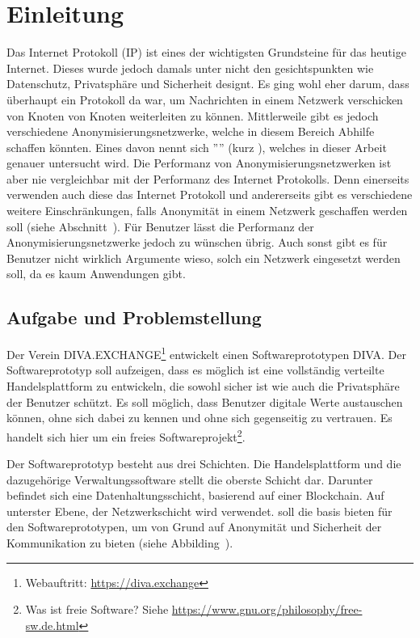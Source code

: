 \chapter{Einleitung}
\label{ch:Einleitung}

Das Internet Protokoll (IP) ist eines der wichtigsten Grundsteine für das heutige Internet.
Dieses wurde jedoch damals unter nicht den gesichtspunkten wie Datenschutz, Privatsphäre und Sicherheit designt.
Es ging wohl eher darum, dass überhaupt ein Protokoll da war, um Nachrichten in einem Netzwerk verschicken von Knoten von Knoten weiterleiten zu können.
Mittlerweile gibt es jedoch verschiedene Anonymisierungsnetzwerke, welche in diesem Bereich Abhilfe schaffen könnten.
Eines davon nennt sich '''' (kurz ), welches in dieser Arbeit genauer untersucht wird.
Die Performanz von Anonymisierungsnetzwerken ist aber nie vergleichbar mit der Performanz des Internet Protokolls.
Denn einerseits verwenden auch diese das Internet Protokoll und andererseits gibt es verschiedene weitere Einschränkungen, falls Anonymität in einem Netzwerk geschaffen werden soll (siehe Abschnitt~). Für Benutzer lässt die Performanz der Anonymisierungsnetzwerke jedoch zu wünschen übrig.
Auch sonst gibt es für Benutzer nicht wirklich Argumente wieso, solch ein Netzwerk eingesetzt werden soll, da es kaum Anwendungen gibt.

\section{Aufgabe und Problemstellung}\label{sec:aufgabe}

Der Verein DIVA.EXCHANGE\footnote{Webauftritt: \url{https://diva.exchange}} entwickelt einen Softwareprototypen DIVA.
Der Softwareprototyp soll aufzeigen, dass es möglich ist eine vollständig verteilte Handelsplattform zu entwickeln,
die sowohl sicher ist wie auch die Privatsphäre der Benutzer schützt.
Es soll möglich, dass Benutzer digitale Werte austauschen können, ohne sich dabei zu kennen und ohne sich gegenseitig zu vertrauen.
Es handelt sich hier um ein freies Softwareprojekt\footnote{Was ist freie Software? Siehe \url{https://www.gnu.org/philosophy/free-sw.de.html}}.

Der Softwareprototyp besteht aus drei Schichten.
Die Handelsplattform und die dazugehörige Verwaltungssoftware stellt die oberste Schicht dar.
Darunter befindet sich eine Datenhaltungsschicht, basierend auf einer Blockchain.
Auf unterster Ebene, der Netzwerkschicht wird  verwendet.
 soll die basis bieten für den Softwareprototypen, um von Grund auf Anonymität und Sicherheit der Kommunikation zu bieten (siehe Abbilding~).

